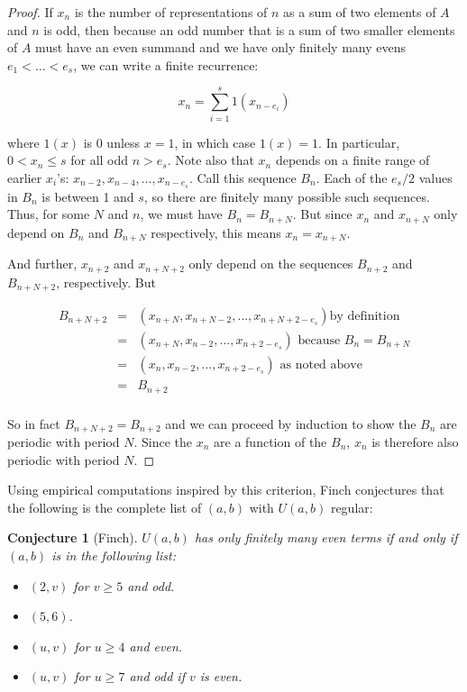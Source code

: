 \documentclass{article}
\newtheorem{conjecture}[theorem]{Conjecture}
\theoremstyle{definition}
\theoremstyle{remark}
\numberwithin{equation}{section}
\begin{document}
\begin{proof}

  If $x_n$ is the number of representations of $n$ as a sum of two
  elements of $A$ and $n$ is odd, then because an odd number that is a
  sum of two smaller elements of $A$ must have an even summand and we
  have only finitely many evens $e_1 < \ldots < e_s$, we can write a
  finite recurrence:

  \[x_n = \sum_{i=1}^s 1(x_{n-e_i})\]
  
  where $1(x)$ is 0 unless $x = 1$, in which case $1(x) = 1$.  In
  particular, $0 < x_n \leq s$ for all odd $n > e_s$.  Note also that
  $x_n$ depends on a finite range of earlier $x_i$'s:
  $x_{n-2}, x_{n-4}, \ldots, x_{n-e_s}$.  Call this sequence $B_n$.
  Each of the $e_s/2$ values in $B_n$ is between 1 and $s$, so there
  are finitely many possible such sequences.  Thus, for some $N$ and
  $n$, we must have $B_n = B_{n+N}$.  But since $x_n$ and $x_{n+N}$
  only depend on $B_n$ and $B_{n+N}$ respectively, this means
  $x_n = x_{n+N}$.

  And further, $x_{n+2}$ and $x_{n+N+2}$ only depend on the sequences
  $B_{n+2}$ and $B_{n+N+2}$, respectively.  But 

  \begin{eqnarray*}
    B_{n+N+2} &=& (x_{n+N}, x_{n+N-2}, \ldots, x_{n+N+2-e_s}) \text{
    by definition}\\
    &=& (x_{n+N}, x_{n-2}, \ldots, x_{n+2-e_s}) \text{ because $B_n
                                                  = B_{n+N}$}\\
    &=& (x_{n}, x_{n-2}, \ldots, x_{n+2-e_s}) \text{ as noted
                                                above}\\
              &=& B_{n+2}\\
  \end{eqnarray*}

  So in fact $B_{n+N+2} = B_{n+2}$ and we can proceed by induction to
  show the $B_n$ are periodic with period $N$.  Since the $x_n$ are a
  function of the $B_n$, $x_n$ is therefore also periodic with period
  $N$.
\end{proof}

Using empirical computations inspired by this criterion, Finch
conjectures \cite{patterns_finch} that the following is the complete
list of $(a,b)$ with $U(a,b)$ regular:

\begin{conjecture}[Finch]
  $U(a,b)$ has only finitely many even terms if and only if $(a,b)$ is
  in the following list:

\begin{itemize}
\item $(2,v)$ for $v \geq 5$ and odd.
\item $(5,6)$.
\item $(u,v)$ for $u \geq 4$ and even.
\item $(u,v)$ for $u \geq 7$ and odd if $v$ is even.
\end{itemize}
\end{conjecture}
\end{document}
